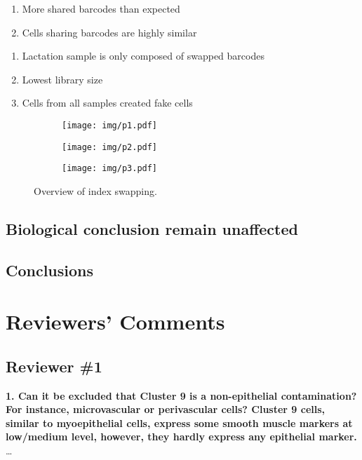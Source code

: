 \documentclass{article}
\begin{document}
\begin{enumerate}
    \item More shared barcodes than expected
    \item Cells sharing barcodes are highly similar
\end{enumerate}
\begin{enumerate}
    \item Lactation sample is only composed of swapped barcodes
    \item Lowest library size
    \item Cells from all samples created fake cells
\end{enumerate}
\begin{figure}
    \begin{subfigure}[c]{0.5\textwidth}
	\texttt{[image: img/p1.pdf]}
    \caption{}
    \end{subfigure}
    \begin{subfigure}[c]{0.5\textwidth}
	\texttt{[image: img/p2.pdf]}
    \caption{}
    \end{subfigure}
    \begin{subfigure}[c]{0.5\textwidth}
	\texttt{[image: img/p3.pdf]}
    \caption{}
    \end{subfigure}
    \caption{Overview of index swapping.
    }
    \label{F2}
\end{figure}
\subsection*{Biological conclusion remain unaffected}
\subsection*{Conclusions}

\section*{Reviewers' Comments}
\subsection*{Reviewer \#1}
\textbf{1. Can it be excluded that Cluster 9 is a non-epithelial contamination? For instance, microvascular or perivascular cells? Cluster 9 cells, similar to myoepithelial cells, express some smooth muscle markers at low/medium level, however, they hardly express any epithelial marker.}\\
\ldots
\end{document}

